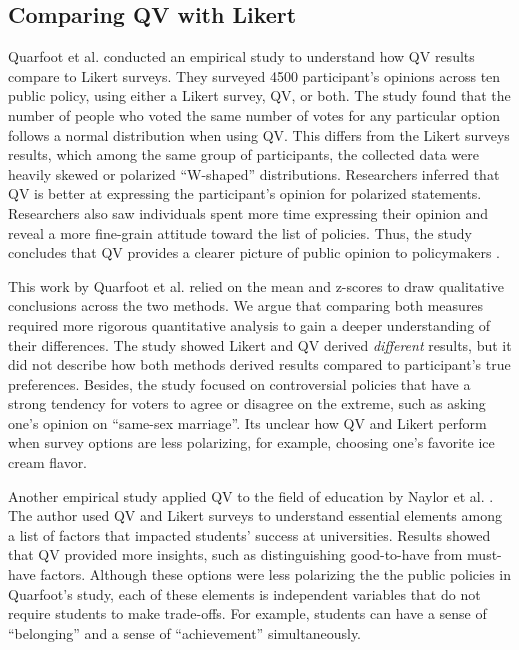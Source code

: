 \subsection{Comparing QV with Likert}
Quarfoot et al. \cite{quarfoot2017quadratic} conducted an empirical study to understand how QV results compare to Likert surveys. They surveyed 4500 participant's opinions across ten public policy, using either a Likert survey, QV, or both. The study found that the number of people who voted the same number of votes for any particular option follows a normal distribution when using QV. This differs from the Likert surveys results, which among the same group of participants, the collected data were heavily skewed or polarized ``W-shaped'' distributions. Researchers inferred that QV is better at expressing the participant's opinion for polarized statements. Researchers also saw individuals spent more time expressing their opinion and reveal a more fine-grain attitude toward the list of policies. Thus, the study concludes that QV provides a clearer picture of public opinion to policymakers \cite{quarfoot2017quadratic}.

This work by Quarfoot et al. relied on the mean and z-scores to draw qualitative conclusions across the two methods. We argue that comparing both measures required more rigorous quantitative analysis to gain a deeper understanding of their differences. The study showed Likert and QV derived \textit{different} results, but it did not describe how both methods derived results compared to participant's true preferences. Besides, the study focused on controversial policies that have a strong tendency for voters to agree or disagree on the extreme, such as asking one's opinion on ``same-sex marriage''. Its unclear how QV and Likert perform when survey options are less polarizing, for example, choosing one's favorite ice cream flavor.\par

Another empirical study applied QV to the field of education by Naylor et al. \cite{naylor2017first}. The author used QV and Likert surveys to understand essential elements among a list of factors that impacted students' success at universities. Results showed that QV provided more insights, such as distinguishing good-to-have from must-have factors. Although these options were less polarizing the the public policies in Quarfoot's study, each of these elements is independent variables that do not require students to make trade-offs. For example, students can have a sense of ``belonging'' and a sense of ``achievement'' simultaneously.

